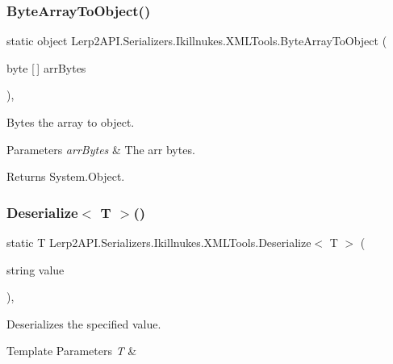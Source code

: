 \subsubsection{\texorpdfstring{Byte\+Array\+To\+Object()}{ByteArrayToObject()}}
{\footnotesize\ttfamily static object Lerp2\+A\+P\+I.\+Serializers.\+Ikillnukes.\+X\+M\+L\+Tools.\+Byte\+Array\+To\+Object (\begin{DoxyParamCaption}\item[{byte \mbox{[}$\,$\mbox{]}}]{arr\+Bytes }\end{DoxyParamCaption})\hspace{0.3cm}{\ttfamily [inline]}, {\ttfamily [static]}}



Bytes the array to object. 


\begin{DoxyParams}{Parameters}
{\em arr\+Bytes} & The arr bytes.\\
\hline
\end{DoxyParams}
\begin{DoxyReturn}{Returns}
System.\+Object.
\end{DoxyReturn}
\mbox{\label{class_lerp2_a_p_i_1_1_serializers_1_1_ikillnukes_1_1_x_m_l_tools_a108fbe03d5e7378ad8018b3de077c040}} 
\subsubsection{\texorpdfstring{Deserialize$<$ T $>$()}{Deserialize< T >()}}
{\footnotesize\ttfamily static T Lerp2\+A\+P\+I.\+Serializers.\+Ikillnukes.\+X\+M\+L\+Tools.\+Deserialize$<$ T $>$ (\begin{DoxyParamCaption}\item[{string}]{value }\end{DoxyParamCaption})\hspace{0.3cm}{\ttfamily [inline]}, {\ttfamily [static]}}



Deserializes the specified value. 


\begin{DoxyTemplParams}{Template Parameters}
{\em T} & \\
\hline
\end{DoxyTemplParams}

